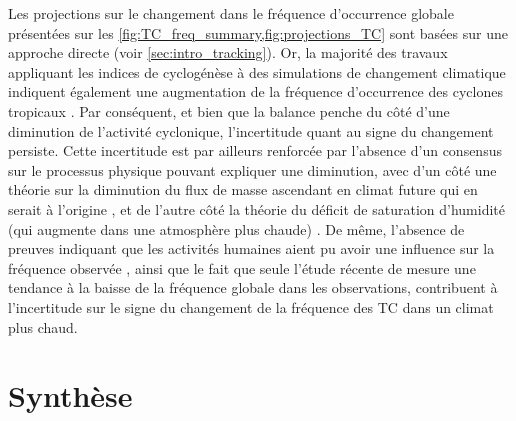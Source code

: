 \documentclass[../main.tex]{subfiles}
\begin{document}
Les projections sur le changement dans le fréquence d'occurrence globale présentées sur les \cref{fig:TC_freq_summary,fig:projections_TC} sont basées sur une
approche directe (voir \cref{sec:intro_tracking}). Or, la majorité des travaux appliquant les indices de cyclogénèse à des simulations de changement climatique
indiquent également une augmentation de la fréquence d'occurrence des cyclones tropicaux
\parencite{zhang_changes_2010,emanuel_downscaling_2013,camargo_testing_2014,wehner_resolution_2015,chauvin_future_2020,cattiaux_projected_2020}. Par conséquent,
et bien que la balance penche du côté d'une diminution de l'activité cyclonique, l'incertitude quant au signe du changement persiste. Cette incertitude est par
ailleurs renforcée par l'absence d'un consensus sur le processus physique pouvant expliquer une diminution, avec d'un côté une théorie sur la diminution du flux
de masse ascendant en climat future qui en serait à l'origine \parencite{sugi_decreasing_2012,satoh_constraint_2015}, et de l'autre côté la théorie du déficit
de saturation d'humidité (qui augmente dans une atmosphère plus chaude) \parencite{emanuel_hurricanes_2008,camargo_testing_2014,tang_environmental_2014}. De
même, l'absence de preuves indiquant que les activités humaines aient pu avoir une influence sur la fréquence observée \parencite{knutson_tropical_2019}, ainsi
que le fait que seule l'étude récente de \cite{klotzbach_trends_2022} mesure une tendance à la baisse de la fréquence globale dans les observations, contribuent
à l'incertitude sur le signe du changement de la fréquence des TC dans un climat plus chaud.

\section{Synthèse}
\end{document}
